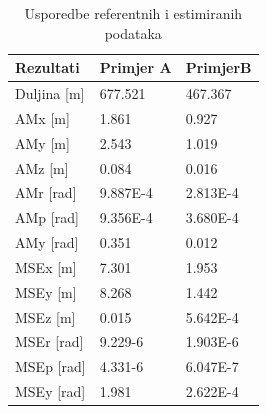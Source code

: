 \begin{table}[H]
  \centering
  \begin{tabular}{ |p{3cm}| |p{3cm}|p{3cm}| }
    \hline
    Rezultati& Primjer A& PrimjerB\\
    \hline
    Duljina [m]& 677.521& 467.367\\
    AMx [m]& 1.861& 0.927\\
    AMy [m]& 2.543& 1.019\\
    AMz [m]& 0.084& 0.016\\
    AMr [rad]& 9.887E-4& 2.813E-4\\
    AMp [rad]& 9.356E-4& 3.680E-4\\
    AMy [rad]& 0.351& 0.012\\
    \hline
    MSEx [m]& 7.301& 1.953\\
    MSEy [m]& 8.268& 1.442\\
    MSEz [m]& 0.015& 5.642E-4\\
    MSEr [rad]& 9.229-6& 1.903E-6\\
    MSEp [rad]& 4.331-6& 6.047E-7\\
    MSEy [rad]& 1.981& 2.622E-4\\
    \hline
  \end{tabular}
  \caption{Usporedbe referentnih i estimiranih podataka}
  \label{res:ref_est_table}
\end{table}
\pagebreak

